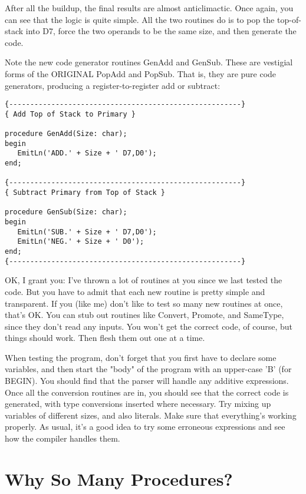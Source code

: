 After  all   the   buildup, the   final   results   are  almost anticlimactic. Once  again, you can see that the logic is quite simple. All the two routines do is to pop the  top-of-stack into D7, force the two operands to be the same size, and then generate the code.

Note  the  new  code generator routines GenAdd and GenSub. These are vestigial forms of the ORIGINAL PopAdd and PopSub. That is, they  are pure code generators, producing a  register-to-register add or subtract:

\begin{verbatim}
{-------------------------------------------------------}
{ Add Top of Stack to Primary }

procedure GenAdd(Size: char);
begin
   EmitLn('ADD.' + Size + ' D7,D0');
end;

{-------------------------------------------------------}
{ Subtract Primary from Top of Stack }

procedure GenSub(Size: char);
begin
   EmitLn('SUB.' + Size + ' D7,D0');
   EmitLn('NEG.' + Size + ' D0');
end;
{-------------------------------------------------------}
\end{verbatim}

OK, I grant you:  I've thrown a lot of routines at you since  we last tested the code. But  you  have  to  admit  that  each new routine is pretty simple and transparent. If you (like me) don't like to test so many new  routines  at  once, that's OK. You can stub out routines like Convert, Promote, and SameType, since they don't  read  any inputs. You won't  get  the  correct  code, of course, but things should work. Then flesh  them  out  one  at a time.

When testing the program, don't  forget  that  you first have to declare some variables, and then  start the "body" of the program with an upper-case  'B'  (for  BEGIN). You should find that the parser  will  handle  any  additive  expressions. Once  all  the conversion routines are in, you should see that the  correct code is  generated, with  type  conversions inserted where necessary. Try mixing up variables  of  different  sizes, and also literals. Make sure that everything's working properly. As  usual, it's a good  idea  to  try  some  erroneous expressions and see how  the compiler handles them.

\section{Why So Many Procedures?}

